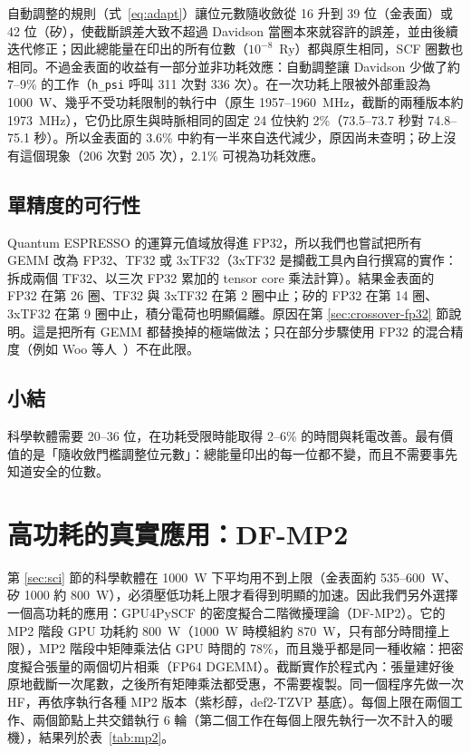 自動調整的規則（式~\eqref{eq:adapt}）讓位元數隨收斂從 16 升到 39 位（金表面）或 42 位（矽），使截斷誤差大致不超過 Davidson 當圈本來就容許的誤差，並由後續迭代修正；因此總能量在印出的所有位數（$10^{-8}$~Ry）都與原生相同，SCF 圈數也相同。不過金表面的收益有一部分並非功耗效應：自動調整讓 Davidson 少做了約 7–9\% 的工作（\texttt{h\_psi} 呼叫 311 次對 336 次）。在一次功耗上限被外部重設為 1000~W、幾乎不受功耗限制的執行中（原生 1957–1960~MHz，截斷的兩種版本約 1973~MHz），它仍比原生與時脈相同的固定 24 位快約 2\%（73.5–73.7 秒對 74.8–75.1 秒）。所以金表面的 3.6\% 中約有一半來自迭代減少，原因尚未查明；矽上沒有這個現象（206 次對 205 次），2.1\% 可視為功耗效應。

\subsection{單精度的可行性}\label{sec:sci-fp32}

Quantum ESPRESSO 的運算元值域放得進 FP32，所以我們也嘗試把所有 GEMM 改為 FP32、TF32 或 3xTF32（3xTF32 是攔截工具內自行撰寫的實作：拆成兩個 TF32、以三次 FP32 累加的 tensor core 乘法計算）。結果金表面的 FP32 在第 26 圈、TF32 與 3xTF32 在第 2 圈中止；矽的 FP32 在第 14 圈、3xTF32 在第 9 圈中止，積分電荷也明顯偏離。原因在第 \ref{sec:crossover-fp32} 節說明。這是把所有 GEMM 都替換掉的極端做法；只在部分步驟使用 FP32 的混合精度（例如 Woo 等人~\cite{Woo2023}）不在此限。

\subsection{小結}

科學軟體需要 20–36 位，在功耗受限時能取得 2–6\% 的時間與耗電改善。最有價值的是「隨收斂門檻調整位元數」：總能量印出的每一位都不變，而且不需要事先知道安全的位數。

\section{高功耗的真實應用：DF-MP2}\label{sec:mp2}

第 \ref{sec:sci} 節的科學軟體在 1000~W 下平均用不到上限（金表面約 535–600~W、矽 1000 約 800~W），必須壓低功耗上限才看得到明顯的加速。因此我們另外選擇一個高功耗的應用：GPU4PySCF 的密度擬合二階微擾理論（DF-MP2）。它的 MP2 階段 GPU 功耗約 800~W（1000~W 時模組約 870~W，只有部分時間撞上限），MP2 階段中矩陣乘法佔 GPU 時間的 78\%，而且幾乎都是同一種收縮：把密度擬合張量的兩個切片相乘（FP64 DGEMM）。截斷實作於程式內：張量建好後原地截斷一次尾數，之後所有矩陣乘法都受惠，不需要複製。同一個程序先做一次 HF，再依序執行各種 MP2 版本（紫杉醇，def2-TZVP 基底）。每個上限在兩個工作、兩個節點上共交錯執行 6 輪（第二個工作在每個上限先執行一次不計入的暖機），結果列於表~\ref{tab:mp2}。

